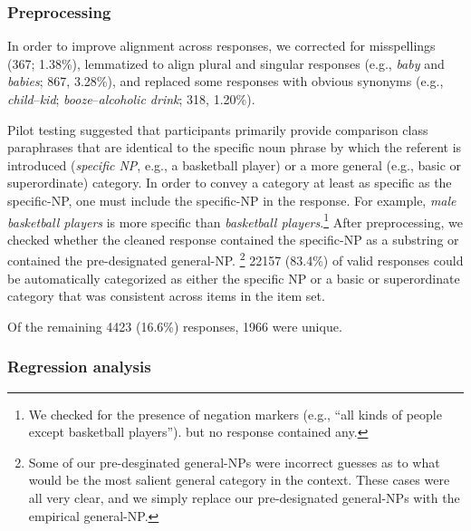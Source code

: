 \documentclass[doc]{apa6}
\begin{document}
\subsubsection{Preprocessing}

In order to improve alignment across responses, we corrected for misspellings (367; 1.38\%), lemmatized to align plural and singular responses (e.g., \emph{baby} and \emph{babies}; 867, 3.28\%), and replaced some responses with obvious synonyms (e.g., \emph{child}--\emph{kid}; \emph{booze}--\emph{alcoholic drink}; 318, 1.20\%). 

Pilot testing suggested that participants primarily provide comparison class paraphrases that are identical to the specific noun phrase by which the referent is introduced (\emph{specific NP}, e.g., a basketball player) or a more general (e.g., basic or superordinate) category. 
In order to convey a category at least as specific as the specific-NP, one must include the specific-NP in the response. 
For example, \emph{male basketball players} is more specific than \emph{basketball players}.\footnote{We checked for the presence of negation markers (e.g., ``all kinds of people except basketball players''). but no response contained any.}
After preprocessing, we checked whether the cleaned response contained the specific-NP as a substring or contained the pre-designated general-NP. \footnote{Some of our pre-desginated general-NPs were incorrect guesses as to what would be the most salient general category in the context. These cases were all very clear, and we simply replace our pre-designated general-NPs with the empirical general-NP.}
22157 (83.4\%) of valid responses could be automatically categorized as either the specific NP or a basic or superordinate category that was consistent across items in the item set. 

Of the remaining 4423 (16.6\%) responses, 1966 were unique. 

\subsubsection{Regression analysis}
\end{document}
